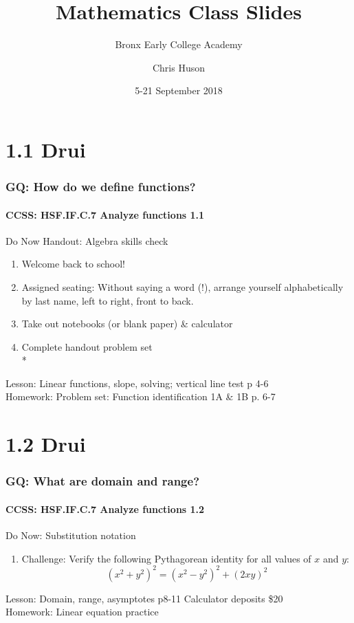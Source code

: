 \documentclass{beamer}
\title{Mathematics Class Slides}
\subtitle{Bronx Early College Academy}
\author{Chris Huson}
\date{5-21 September 2018}
\begin{document}
\frame{\titlepage}


  \section{1.1 Drui}
  \frame
  {
    \frametitle{GQ: How do we define functions?}
    \framesubtitle{CCSS: HSF.IF.C.7 Analyze functions \qquad \qquad \qquad \alert{1.1}}

    \begin{block}{Do Now Handout: Algebra skills check}
    \begin{enumerate}
        \item Welcome back to school!
        \item Assigned seating: \alert{Without saying a word (!),} arrange yourself alphabetically by last name, left to right, front to back.
        \item Take out notebooks (or blank paper) \& calculator
        \item Complete handout problem set\\*
    \end{enumerate}
    \end{block}
    Lesson: Linear functions, slope, solving; vertical line test p 4-6 \\%
    Homework: Problem set: Function identification 1A \& 1B p. 6-7
  }

  \section{1.2 Drui}
  \frame
  {
    \frametitle{GQ: What are domain and range?}
    \framesubtitle{CCSS: HSF.IF.C.7 Analyze functions \qquad \qquad \qquad \qquad \alert{1.2}}

    \begin{block}{Do Now: Substitution notation}
    \begin{enumerate}
        \item Challenge: %
        Verify the following Pythagorean identity for all values of $x$ and $y$:
        \[(x^2+y^2)^2=(x^2-y^2)^2+(2xy)^2\]
    \end{enumerate}
    \end{block}
    Lesson: Domain, range, asymptotes p8-11
    Calculator deposits \$20
    \\%
    Homework: Linear equation practice
  }
\end{document}
